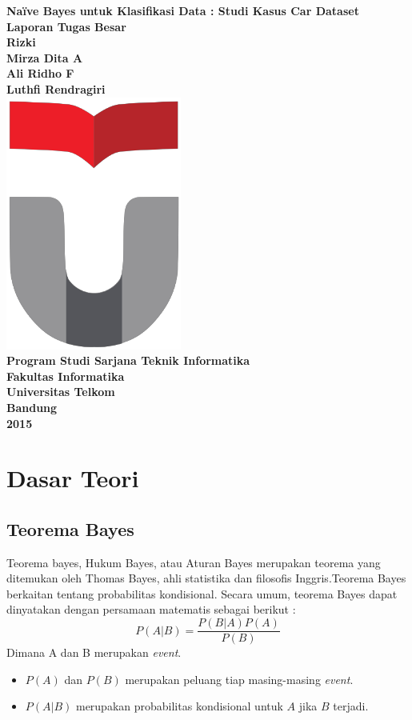 \documentclass[11pt,a4paper]{report}
\begin{document}
	\begingroup
	\thispagestyle{empty}  
	\begin{center}
		\textbf{
			\Large
			Na\"{i}ve Bayes untuk Klasifikasi Data : Studi Kasus Car Dataset\\[1cm]
			\normalsize
			Laporan Tugas Besar	
			\\[1cm]
			Rizki\\
			Mirza Dita A\\
			Ali Ridho F\\
			Luthfi Rendragiri
			\\[2cm]
			\includegraphics[width=0.35\linewidth]{logo}\\[2cm]
			\Large
			Program Studi Sarjana Teknik Informatika\\
			Fakultas Informatika\\
			Universitas Telkom\\
			Bandung\\[0.2cm]
			2015}
	\end{center}
	\endgroup
	\newpage
	\chapter{Dasar Teori}
	\section{Teorema Bayes}
	Teorema bayes, Hukum Bayes, atau Aturan Bayes merupakan teorema yang ditemukan oleh Thomas Bayes, ahli statistika dan filosofis Inggris.Teorema Bayes berkaitan tentang probabilitas kondisional. Secara umum, teorema Bayes dapat dinyatakan dengan persamaan matematis sebagai berikut :
	\[ P(A|B)=\frac{P(B|A)P(A)}{P(B)} \]
	Dimana A dan B merupakan \emph{event}.
	\begin{itemize}
		\item $P(A)$ dan $P(B)$ merupakan peluang tiap masing-masing \emph{event}.
		\item $P(A|B)$ merupakan probabilitas kondisional untuk $A$ jika $B$ terjadi.
	\end{itemize} 
	
\end{document}
